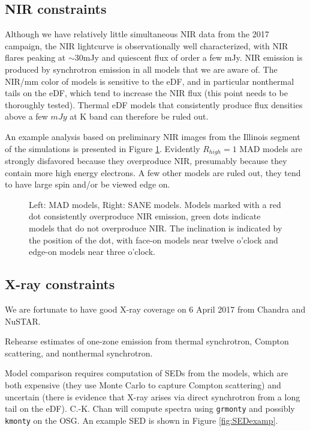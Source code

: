 \documentclass[twocolumn,tighten]{aastex63}
\newcommand\<{{\langle}}
\renewcommand\>{{\rangle}} %
\begin{document}
\subsection{NIR constraints}

Although we have relatively little simultaneous NIR data from the 2017 campaign, the NIR lightcurve is observationally well characterized, with NIR flares peaking at $\sim 30$mJy and quiescent flux of order a few mJy.  NIR emission is produced by synchrotron emission in all models that we are aware of.  The NIR/mm color of models is sensitive to the eDF, and in particular nonthermal tails on the eDF, which tend to increase the NIR flux (this point needs to be thoroughly tested).  Thermal eDF models that consistently produce flux densities above a few $mJy$ at K band can therefore be ruled out.

An example analysis based on preliminary NIR images from the Illinois segment of the simulations is presented in Figure \ref{fig:NIRmodels}.  Evidently $R_{high} = 1$ MAD models are strongly disfavored because they overproduce NIR, presumably because they contain more high energy electrons.  A few other models are ruled out, they tend to have large spin and/or be viewed edge on.

\begin{figure}
    \centering
    \caption{Left: MAD models, Right: SANE models.  Models marked with a red dot consistently overproduce NIR emission, green dots indicate models that do not overproduce NIR.  The inclination is indicated by the position of the dot, with face-on models near twelve o'clock and edge-on models near three o'clock.}
    \label{fig:NIRmodels}
\end{figure}

\subsection{X-ray constraints}

We are fortunate to have good X-ray coverage on 6 April 2017 from Chandra and NuSTAR.

Rehearse estimates of one-zone emission from thermal synchrotron, Compton scattering, and nonthermal synchrotron.

Model comparison requires computation of SEDs from the models, which are both expensive (they use Monte Carlo to capture Compton scattering) and uncertain (there is evidence that X-ray arises via direct synchrotron from a long tail on the eDF).  C.-K. Chan will compute spectra using {\tt grmonty} and possibly {\tt kmonty} on the OSG.  An example SED is shown in Figure \ref{fig:SEDexamp}.
\end{document}
